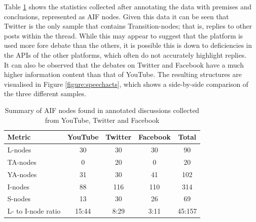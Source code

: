 

Table \ref{table:results:annotations} shows the statistics collected after annotating the data with premises and conclusions, represented as AIF nodes. Given this data it can be seen that Twitter is the only sample that contains Transition-nodes; that is, replies to other posts within the thread. While this may appear to suggest that the platform is used more fore debate than the others, it is possible this is down to deficiencies in the APIs of the other platforms, which often do not accurately highlight replies. It can also be observed that the debates on Twitter and Facebook have a much higher information content than that of YouTube. The resulting structures are visualised in Figure \ref{figure:speechacts}, which shows a side-by-side comparison of the three different samples.

\begin{table}
\centering
\caption{Summary of AIF nodes found in annotated discussions collected from YouTube, Twitter and Facebook}
\label{table:results:annotations}
\begin{tabular}{| l | c | c | c | c |}
\hline
\textbf{Metric} & \textbf{YouTube} & \textbf{Twitter} & \textbf{Facebook} & \textbf{Total} \\
\hline
L-nodes 			& 30	& 30 	& 30 	& 90\\
\hline
TA-nodes 			& 0		& 20 	& 0 	& 20\\
\hline
YA-nodes 			& 31	& 30	& 41 	& 102\\
\hline
I-nodes 			& 88	& 116	& 110 	& 314\\
\hline
S-nodes 			& 13	& 30    & 26 	& 69\\
\hline
L- to I-node ratio 	& 15:44	& 8:29  & 3:11	& 45:157\\
\hline
\end{tabular}
\end{table}

